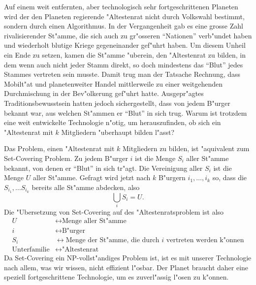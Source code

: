 Auf einem weit entfernten, aber technologisch sehr fortgeschrittenen
Planeten wird der den Planeten regierende "Altestenrat
nicht durch Volkswahl bestimmt, sondern durch einen Algorithmus.
In der Vergangenheit gab es eine grosse Zahl rivalisierender
St"amme, die sich auch zu gr"osseren ``Nationen'' verb"undet haben
und wiederholt blutige Kriege gegeneinander gef"uhrt haben.
Um diesem Unheil ein Ende zu setzen, kamen die St"amme "uberein,
den "Altestenrat zu bilden, in dem wenn auch nicht jeder Stamm direkt,
so doch mindestens das ``Blut'' jedes Stammes vertreten sein musste.
Damit trug man der Tatsache Rechnung, dass Mobilt"at und planetenweiter
Handel mittlerweile zu einer weitgehenden Durchmischung in der
Bev"olkerung gef"uhrt hatte. Ausgepr"agtes Traditionsbewusstsein hatten
jedoch sichergestellt, dass von jedem B"urger bekannt war, aus welchen
St"ammen er ``Blut'' in sich trug. Warum ist trotzdem eine weit entwickelte
Technologie n"otig, um herauszufinden, ob sich ein "Altestenrat
mit $k$ Mitgliedern "uberhaupt bilden l"asst?

\begin{loesung}
Das Problem, einen "Altestenrat mit $k$  Mitgliedern zu bilden, ist
"aquivalent zum Set-Covering Problem. Zu jedem B"urger $i$
ist die Menge $S_i$ aller St"amme bekannt, von denen er ``Blut''
in sich tr"agt. Die Vereinigung aller $S_i$ ist die Menge $U$ aller
St"amme. Gefragt wird jetzt nach $k$ B"urgern $i_1,\dots,i_k$ so,
dass die $S_{i_1},\dots S_{i_k}$ bereits alle St"amme abdecken, also
\[
\bigcup_i S_i=U.
\]
Die "Ubersetzung von Set-Covering auf des "Altestenratsproblem ist also
\begin{align*}
U&\leftrightarrow\text{Menge aller St"amme}\\
i&\leftrightarrow\text{B"urger}\\
S_i&\leftrightarrow\text{Menge der St"amme, die durch $i$ vertreten werden k"onnen}\\
\text{Unterfamilie}&\leftrightarrow\text{"Altestenrat}
\end{align*}
Da Set-Covering ein NP-vollst"andiges Problem ist, ist es mit unserer
Technologie nach allem, was wir wissen, nicht effizient l"osbar. Der
Planet braucht daher eine speziell fortgeschrittene Technologie, um es
zuverl"assig l"osen zu k"onnen.
\end{loesung}
